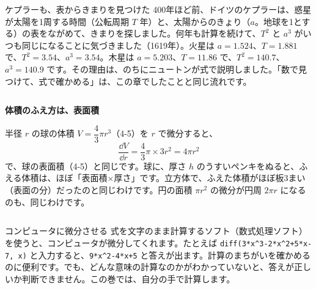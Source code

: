 \begin{column}{ケプラーも、表からきまりを見つけた}
400年ほど前、ドイツのケプラーは、惑星が太陽を1周する時間（公転周期 $T$ 年）と、太陽からのきょり（$a$。地球を1とする）の表をながめて、きまりを探しました。何年も計算を続けて、$T^2$ と $a^3$ がいつも同じになることに気づきました（1619年）。火星は $a=1.524$、$T=1.881$ で、$T^2=3.54$、$a^3=3.54$。木星は $a=5.203$、$T=11.86$ で、$T^2=140.7$、$a^3=140.9$ です。その理由は、のちにニュートンが式で説明しました。「数で見つけて、式で確かめる」は、この章でしたことと同じ流れです。
\end{column}

\begin{butsuri}
\noindent\begin{minipage}[c]{0.74\linewidth}
\textbf{体積のふえ方は、表面積}\par
半径 $r$ の球の体積 $V=\dfrac{4}{3}\pi r^3$（4-5）を $r$ で微分すると、
\[ \frac{\dd V}{\dd r}=\frac{4}{3}\pi\times3r^2=4\pi r^2 \]
で、球の表面積（4-5）と同じです。球に、厚さ $h$ のうすいペンキをぬると、ふえる体積は、ほぼ「表面積×厚さ」です。立方体で、ふえた体積がほぼ板3まい（表面の分）だったのと同じわけです。円の面積 $\pi r^2$ の微分が円周 $2\pi r$ になるのも、同じわけです。
\end{minipage}\hfill
\begin{minipage}[c]{0.22\linewidth}\centering
{}
\end{minipage}
\end{butsuri}

\begin{column}{コンピュータに微分させる}
式を文字のまま計算するソフト（数式処理ソフト）を使うと、コンピュータが微分してくれます。たとえば \mbox{\texttt{diff(3*x\^{}3-2*x\^{}2+5*x-7, x)}} と入力すると、\mbox{\texttt{9*x\^{}2-4*x+5}} と答えが出ます。計算のまちがいを確かめるのに便利です。でも、どんな意味の計算なのかがわかっていないと、答えが正しいか判断できません。この巻では、自分の手で計算します。
\end{column}

\bkendproblems
{}


